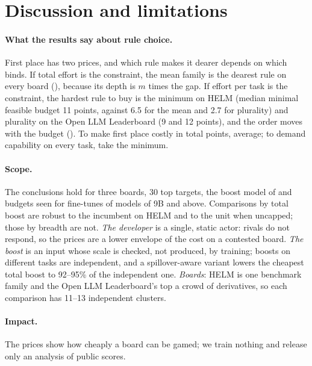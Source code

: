 \section{Discussion and limitations}
\label{sec:discussion}

\paragraph{What the results say about rule choice.}
First place has two prices, and which rule makes it dearer depends on which binds. If total effort is the constraint, the mean family is the dearest rule on every board (), because its depth is $m$ times the gap. If effort per task is the constraint, the hardest rule to buy is the minimum on HELM (median minimal feasible budget 11 points, against 6.5 for the mean and 2.7 for plurality) and plurality on the Open LLM Leaderboard (9 and 12 points), and the order moves with the budget (). To make first place costly in total points, average; to demand capability on every task, take the minimum.

\paragraph{Scope.}
The conclusions hold for three boards, 30 top targets, the boost model of  and budgets seen for fine-tunes of models of 9B and above. Comparisons by total boost are robust to the incumbent on HELM and to the unit when uncapped; those by breadth are not.
\emph{The developer} is a single, static actor: rivals do not respond, so the prices are a lower envelope of the cost on a contested board. \emph{The boost} is an input whose scale is checked, not produced, by training; boosts on different tasks are independent, and a spillover-aware variant lowers the cheapest total boost to 92--95\% of the independent one. \emph{Boards}: HELM is one benchmark family and the Open LLM Leaderboard's top a crowd of derivatives, so each comparison has 11--13 independent clusters.

\paragraph{Impact.}
The prices show how cheaply a board can be gamed; we train nothing and release only an analysis of public scores.
